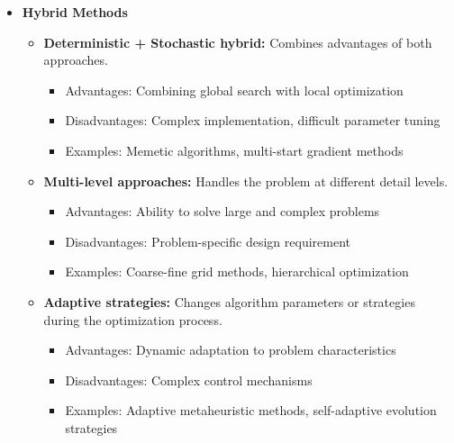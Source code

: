 \begin{itemize}
    \item \textbf{Hybrid Methods} 
        \begin{itemize}
            \item \textbf{Deterministic + Stochastic hybrid:} Combines advantages of both approaches.
                \begin{itemize}
                    \item Advantages: Combining global search with local optimization
                    \item Disadvantages: Complex implementation, difficult parameter tuning
                    \item Examples: Memetic algorithms, multi-start gradient methods
                \end{itemize}
                
            \item \textbf{Multi-level approaches:} Handles the problem at different detail levels.
                \begin{itemize}
                    \item Advantages: Ability to solve large and complex problems
                    \item Disadvantages: Problem-specific design requirement
                    \item Examples: Coarse-fine grid methods, hierarchical optimization
                \end{itemize}
                
            \item \textbf{Adaptive strategies:} Changes algorithm parameters or strategies during the optimization process.
                \begin{itemize}
                    \item Advantages: Dynamic adaptation to problem characteristics
                    \item Disadvantages: Complex control mechanisms
                    \item Examples: Adaptive metaheuristic methods, self-adaptive evolution strategies  
                \end{itemize}
        \end{itemize}
\end{itemize}

